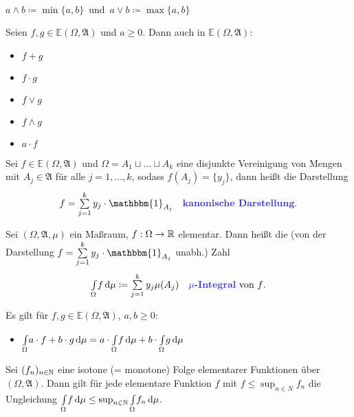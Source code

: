\documentclass{cheat-sheet}
\newcommand{\Alg}{\mathfrak{A}} %
\newcommand{\E}{\mathbb{E}} %
\newcommand{\ind}{\mathbbm{1}} %
\newcommand{\IntOmu}[1]{\Int{\Omega}{}{#1}{\mu}} %
\begin{document}
\begin{nota}
  $a \wedge b \coloneqq \min \{a, b\} \enspace \text{und} \enspace a \vee b \coloneqq \max \{a, b\}$
\end{nota}

\begin{satz}
  Seien $f, g \in \E(\Omega, \Alg)$ und $a \geq 0$. Dann auch in $\E(\Omega, \Alg)$:
  \begin{multicols}{5}
    \begin{itemize}
      \item $f + g$
      \item $f \cdot g$
      \item $f \vee g$
      \item $f \wedge g$
      \item $a \cdot f$
    \end{itemize}
  \end{multicols}
\end{satz}

\begin{defn}
  Sei $f \in \E(\Omega, \Alg)$ und $\Omega = A_1 \sqcup ... \sqcup A_k$ eine disjunkte Vereinigung von Mengen mit $A_j \in \Alg$ für alle $j = 1, ..., k$, sodass $f(A_j) = \{ y_j \}$, dann heißt die Darstellung
  \[ f = \sum_{j=1}^k y_j \cdot \ind_{A_j} \quad \text{\emph{kanonische Darstellung}.} \]
\end{defn}

\begin{defn}
  Sei $(\Omega, \Alg, \mu)$ ein Maßraum, $f : \Omega \to \mathbb{R}$ elementar. Dann heißt die (von der Darstellung $f = \sum_{j=1}^k y_j \cdot \ind_{A_j}$ unabh.) Zahl
  \[ \IntOmu{f} \coloneqq \sum_{j=1}^k y_j \mu(A_j) \quad \text{\emph{$\mu$-Integral} von $f$.} \]
\end{defn}

\begin{satz}
  Es gilt für $f, g \in \E(\Omega, \Alg)$, $a, b \geq 0$:
  \begin{itemize}
    \miniitem{0.3\linewidth}{$\IntOmu{\ind_A} = \mu(A)$}
    \miniitem{0.5\linewidth}{$f \leq g \implies \IntOmu{f} \leq \IntOmu{g}$}
    \item $\IntOmu{a \cdot f + b \cdot g} = a \cdot \IntOmu{f} + b \cdot \IntOmu{g}$
  \end{itemize}
\end{satz}


\begin{satz}
  Sei $(f_n)_{n \in \mathbb{N}}$ eine isotone (= monotone) Folge elementarer Funktionen über $(\Omega, \Alg)$. Dann gilt für jede elementare Funktion $f$ mit $f \leq \sup_{n \in N} f_n$ die Ungleichung $\IntOmu{f} \leq \sup_{n \in \N} \IntOmu{f_n}$.
\end{satz}
\end{document}
